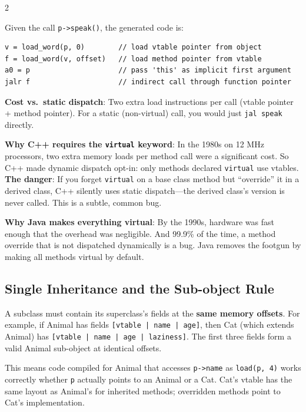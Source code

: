\documentclass[9pt,landscape]{extarticle}
\begin{document}
\begin{multicols}{2}
\begin{exambox}
Given the call \texttt{p->speak()}, the generated code is:
\begin{lstlisting}
v = load_word(p, 0)        // load vtable pointer from object
f = load_word(v, offset)   // load method pointer from vtable
a0 = p                     // pass 'this' as implicit first argument
jalr f                     // indirect call through function pointer
\end{lstlisting}

\textbf{Cost vs.\ static dispatch}: Two extra load instructions per call (vtable pointer + method pointer). For a static (non-virtual) call, you would just \texttt{jal speak} directly.

\textbf{Why C++ requires the \texttt{virtual} keyword}: In the 1980s on 12 MHz processors, two extra memory loads per method call were a significant cost. So C++ made dynamic dispatch opt-in: only methods declared \texttt{virtual} use vtables. \textbf{The danger}: If you forget \texttt{virtual} on a base class method but ``override'' it in a derived class, C++ silently uses static dispatch---the derived class's version is never called. This is a subtle, common bug.

\textbf{Why Java makes everything virtual}: By the 1990s, hardware was fast enough that the overhead was negligible. And 99.9\% of the time, a method override that is not dispatched dynamically is a bug. Java removes the footgun by making all methods virtual by default.
\end{exambox}

\subsection{Single Inheritance and the Sub-object Rule}

A subclass must contain its superclass's fields at the \textbf{same memory offsets}. For example, if Animal has fields \texttt{[vtable | name | age]}, then Cat (which extends Animal) has \texttt{[vtable | name | age | laziness]}. The first three fields form a valid Animal sub-object at identical offsets.

This means code compiled for Animal that accesses \texttt{p->name} as \texttt{load(p, 4)} works correctly whether \texttt{p} actually points to an Animal or a Cat. Cat's vtable has the same layout as Animal's for inherited methods; overridden methods point to Cat's implementation.


\end{multicols}
\end{document}
